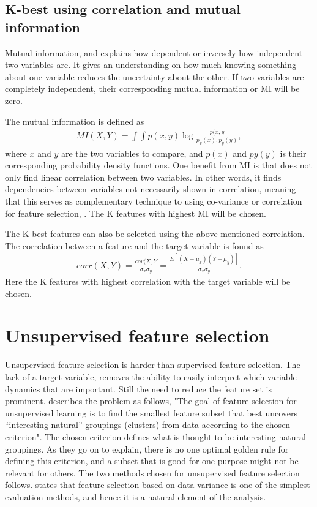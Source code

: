     
    \subsection{K-best using correlation and  mutual information}\label{subsec:K-best_feat_select}
    
        Mutual information, \cite{Kraskov2004} and \cite{Peng2005} explains how dependent or inversely how independent two variables are. It gives an understanding on how much knowing something about one variable reduces the uncertainty about the other. If two variables are completely independent, their corresponding mutual information or MI will be zero. 
        
        The mutual information is defined as
        \begin{align}\label{eq:tech_MI}
                MI(X,Y) = \int \int p(x,y) \log \frac{p(x,y}{p_x(x),p_y(y)},
        \end{align}
        where $x$ and $y$ are the two variables to compare, and $p(x)$ and $py(y)$ is their corresponding probability density functions. One benefit from MI is that does not only find linear correlation between two variables. In other words, it finds dependencies between variables not necessarily shown in correlation, meaning that this serves as complementary technique to using co-variance or correlation for feature selection, \cite{Li}. The K features with highest MI will be chosen. 
        
        
        The K-best features can also be selected using the above mentioned correlation. The correlation between a feature and the target variable is found as  
        \begin{align}
            corr(X,Y) = \frac{cov(X,Y}{\sigma_x\sigma_y} = \frac{E[(X-\mu_x)(Y-\mu_y)]}{\sigma_x\sigma_y}.
        \end{align}
        Here the K features with highest correlation with the target variable will be chosen. 
        
\section{Unsupervised feature selection}\label{sec:unsup_feat_reduc}
    Unsupervised feature selection is harder than supervised feature selection. The lack of a target variable, removes the ability to easily interpret which variable dynamics that are important. Still the need to reduce the feature set is prominent. \cite{Dy2004} describes the problem as follows, "The goal of feature selection for unsupervised learning is to find the smallest feature subset that best uncovers “interesting natural” groupings (clusters) from data according to the chosen criterion". The chosen criterion defines what is thought to be interesting natural groupings. As they go on to explain, there is no one optimal golden rule for defining this criterion, and a subset that is good for one purpose might not be relevant for others. The two methods chosen for unsupervised feature selection follows. \cite{He2005} states that feature selection based on data variance is one of the simplest evaluation methods, and hence it is a natural element of the analysis. 
    
